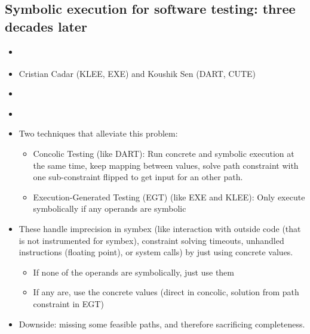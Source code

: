 \documentclass{article}
\begin{document}
\subsection{Symbolic execution for software testing: three decades later}
\begin{itemize}
    \item \cite{ReviewThreeDecades}
    \item Cristian Cadar (KLEE\cite{KLEE}, EXE\cite{EXE}) and Koushik Sen (DART\cite{DART}, CUTE\cite{CUTE})
    \item {}\cite{ReviewThreeDecades}
    \item {}\cite{ReviewThreeDecades}
    \item Two techniques that alleviate this problem:
          \begin{itemize}
              \item Concolic Testing (like DART\cite{DART}): Run concrete and symbolic execution at the same time, keep mapping between values, solve path constraint with one sub-constraint flipped to get input for an other path.
              \item Execution-Generated Testing (EGT) (like EXE\cite{EXE} and KLEE\cite{KLEE}): Only execute symbolically if any operands are symbolic
          \end{itemize}
    \item These handle imprecision in symbex (like interaction with outside code (that is not instrumented for symbex), constraint solving timeouts, unhandled instructions (floating point), or system calls) by just using concrete values.
          \begin{itemize}
              \item If none of the operands are symbolically, just use them
              \item If any are, use the concrete values (direct in concolic, solution from path constraint in EGT)
          \end{itemize}
    \item Downside: missing some feasible paths, and therefore sacrificing completeness.

\end{itemize}
\end{document}
